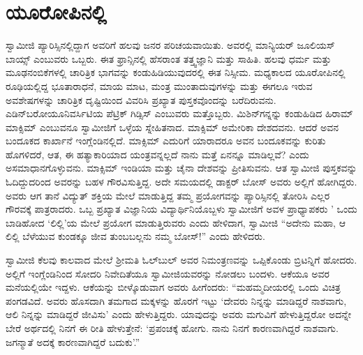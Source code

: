 
\chapter{ಯೂರೋಪಿನಲ್ಲಿ}

 ಸ್ವಾಮೀಜಿ ಪ್ಯಾರಿಸ್ಸಿನಲ್ಲಿದ್ದಾಗ ಅವರಿಗೆ ಹಲವು ಜನರ ಪರಿಚಯವಾಯಿತು. ಅವರಲ್ಲಿ ಮಾನ್ಯಿಯರ್ ಜೂಲಿಯಸ್ ಬಾಯ್ಸ್ ಎಂಬುವರು ಒಬ್ಬರು. ಈತ ಫ್ರಾನ್ಸಿನಲ್ಲಿ ಹೆಸರಾಂತ ತತ್ತ್ವಜ್ಞಾನಿ ಮತ್ತು ಸಾಹಿತಿ. ಹಲವು ಧರ್ಮ ಮತ್ತು ಮೂಢನಂಬಿಕೆಗಳಲ್ಲಿ ಚಾರಿತ್ರಿಕ ಭಾಗವನ್ನು ಕಂಡುಹಿಡಿಯುವುದರಲ್ಲಿ ಈತ ನಿಸ್ಸೀಮ. ಮಧ್ಯಕಾಲದ ಯೂರೋಪಿನಲ್ಲಿ ರೂಢಿಯಲ್ಲಿದ್ದ ಭೂತಾರಾಧನೆ, ಮಾಯ ಮಾಟ, ಮಂತ್ರ ಮುಂತಾದುವುಗಳನ್ನು ಮತ್ತು ಈಗಲೂ ಇರುವ ಅವಶೇಷಗಳನ್ನು ಚಾರಿತ್ರಿಕ ದೃಷ್ಟಿಯಿಂದ ವಿವರಿಸಿ ಪ್ರಖ್ಯಾತ ಪುಸ್ತಕವೊಂದನ್ನು ಬರೆದಿರುವನು. ಎಡಿನ್‍ಬರೋ\break ಯೂನಿವರ್ಸಿಟಿಯ ಪೆಟ್ರಿಕ್ ಗಿಡ್ಸಿಸ್ ಎಂಬುವರು ಮತ್ತೊಬ್ಬರು. ಮಿಶಿನ್‍ಗನ್ನನ್ನು ಕಂಡುಹಿಡಿದ ಹಿರಾಮ್ ಮಾಕ್ಸಿಮ್ ಎಂಬುವನೂ ಸ್ವಾಮೀಜಿಗೆ ಒಳ್ಳೆಯ ಸ್ನೇಹಿತನಾದ. ಮಾಕ್ಸಿಮ್ ಅಮೇರಿಕಾ ದೇಶದವನು. ಆದರೆ ಅವನ ಬಂದೂಕದ ಕಾರ್ಖಾನೆ ಇಂಗ್ಲೆಂಡಿನಲ್ಲಿದೆ. ಮಾಕ್ಸಿಮ್ ಎದುರಿಗೆ ಯಾರಾದರೂ ಅವನ ಬಂದೂಕವನ್ನು ಕುರಿತು ಹೊಗಳಿದರೆ, ಆತ, ಈ ಹತ್ಯಾಕಾರಿಯಾದ ಯಂತ್ರವನ್ನಲ್ಲದೆ ನಾನು ಮತ್ತೆ ಏನನ್ನೂ ಮಾಡಿಲ್ಲವೆ? ಎಂದು ಅಸಮಾಧಾನಗೊಳ್ಳುವನು. ಮಾಕ್ಸಿಮ್ ಇಂಡಿಯಾ ಮತ್ತು ಚೈನಾ ದೇಶವನ್ನು ಪ್ರೀತಿಸುವನು. ಆತ ಸ್ವಾಮೀಜಿ ಪುಸ್ತಕವನ್ನು ಓದಿದ್ದುದರಿಂದ ಅವರನ್ನು ಬಹಳ ಗೌರವಿಸುತ್ತಿದ್ದ. ಅದೇ ಸಮಯದಲ್ಲಿ ಡಾಕ್ಟರ್ ಬೋಸ್ ಅವರು ಅಲ್ಲಿಗೆ ಹೋಗಿದ್ದರು. ಅವರು ಆಗ ತಾನೆ ವಿದ್ಯುತ್ ಶಕ್ತಿಯ ಮೇಲೆ ಮಾಡುತ್ತಿದ್ದ ತಮ್ಮ ಪ್ರಯೋಗವನ್ನು ಪ್ಯಾರಿಸ್ಸಿನಲ್ಲಿ ತೋರಿಸಿ ಎಲ್ಲರ ಗೌರವಕ್ಕೆ ಪಾತ್ರರಾದರು. ಒಬ್ಬ ಪ್ರಖ್ಯಾತ ವಿಜ್ಞಾನಿಯ ವಿದ್ಯಾರ್ಥಿನಿಯೊಬ್ಬಳು ಸ್ವಾಮೀಜಿಗೆ ಅವಳ ಪ್ರಾಧ್ಯಾಪಕರು ' ಒಂದು ಬಾಡಿಹೋದ ‘ಲಿಲ್ಲಿ’ಯ ಮೇಲೆ ಪ್ರಯೋಗ ಮಾಡುತ್ತಿರುವರು ಎಂದು ಹೇಳಿದಾಗ, ಸ್ವಾಮೀಜಿ “ಅದೇನು ಮಹಾ, ಆ ಲಿಲ್ಲಿ ಬೆಳೆಯುವ ಕುಂಡಕ್ಕೂ ಜೀವ ತುಂಬಬಲ್ಲನು ನಮ್ಮ ಬೋಸ್!” ಎಂದು ಹೇಳಿದರು.

 ಸ್ವಾಮೀಜಿ ಕೆಲವು ಕಾಲವಾದ ಮೇಲೆ ಶ‍್ರೀಮತಿ ಓಲ್‍ಬುಲ್ ಅವರ ನಿಮಂತ್ರಣವನ್ನು ಒಪ್ಪಿಕೊಂಡು ಬ್ರಿಟನ್ನಿಗೆ ಹೋದರು. ಅಲ್ಲಿಗೆ ಇಂಗ್ಲೆಂಡಿನಿಂದ ಸೋದರಿ ನಿವೇದಿತೆಯೂ ಸ್ವಾಮೀಜಿಯವರನ್ನು ನೋಡಲು ಬಂದಳು. ಆಕೆಯೂ ಅವರ ಮನೆಯಲ್ಲಿಯೇ ಇದ್ದಳು. ಆಕೆಯನ್ನು ಬೀಳ್ಕೊಡುವಾಗ ಅವರು ಹೀಗೆಂದರು: “ಮಹಮ್ಮದೀಯರಲ್ಲಿ ಒಂದು ವಿಚಿತ್ರ ಪಂಗಡವಿದೆ. ಅವರು ಹೊಸದಾಗಿ ತಮಗಾದ ಮಕ್ಕಳನ್ನು ಹೊರಗೆ ಇಟ್ಟು ‘ದೇವರು ನಿನ್ನನ್ನು ಮಾಡಿದ್ದರೆ ನಾಶವಾಗು, ಆಲಿ ನಿನ್ನನ್ನು ಮಾಡಿದ್ದರೆ ಜೀವಿಸು’ ಎಂದು ಹೇಳುತ್ತಿದ್ದರು. ಯಾವುದನ್ನು ಅವರು ಮಗುವಿಗೆ ಹೇಳುತ್ತಿದ್ದರೋ ಅದನ್ನೇ ಬೇರೆ ಅರ್ಥದಲ್ಲಿ ನಿನಗೆ ಈ ರೀತಿ ಹೇಳುತ್ತೇನೆ: ‘ಪ್ರಪಂಚಕ್ಕೆ ಹೋಗು. ನಾನು ನಿನಗೆ ಕಾರಣವಾಗಿದ್ದರೆ ನಾಶವಾಗು. ಜಗನ್ಮಾತೆ ಅದಕ್ಕೆ ಕಾರಣವಾಗಿದ್ದರೆ ಬದುಕು’.” 

